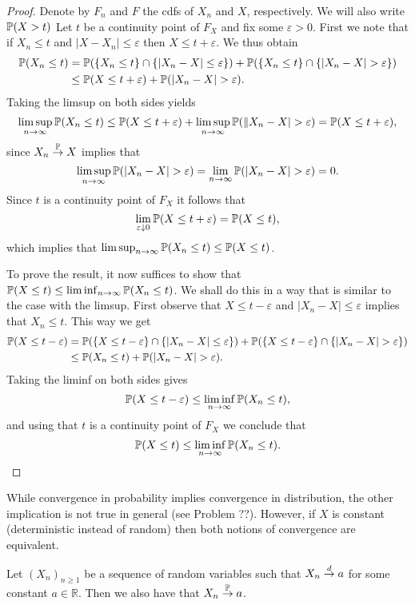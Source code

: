 \begin{proof}
Denote by $F_n$ and $F$ the cdfs of $X_n$ and $X$, respectively. We will also write $\mathbb P(X > t)$ Let $t$ be a continuity point of $F_X$ and fix some $\varepsilon > 0$. First we note that if $X_n \le t$ and $|X-X_n|\le \varepsilon$ then $X \le t + \varepsilon$. We thus obtain
\begin{align*}
	\bbP(X_n \le t)
	&= \bbP(\{X_n \le t\} \cap \{|X_n - X| \le \varepsilon\}) + \bbP(\{X_n \le t\} \cap \{|X_n - X|>\varepsilon\})\\
	&\le \bbP(X \le t + \varepsilon) + \bbP(|X_n - X| > \varepsilon).
\end{align*}
Taking the limsup on both sides yields
\[
	\limsup_{n \to \infty} \mathbb P(X_n \le t)
	\le \mathbb P(X \le t + \varepsilon) + \limsup_{n \to \infty} \mathbb P(\|X_n - X| > \varepsilon)
	= \mathbb P(X \le t + \varepsilon),
\]
since $X_n \stackrel{\mathbb P}{\rightarrow} X$ implies that
\[
	\limsup_{n \to \infty} \mathbb P(|X_n - X| > \varepsilon)
	= \lim_{n \to \infty} \mathbb P(|X_n - X| > \varepsilon) = 0.
\]
Since $t$ is a continuity point of $F_X$ it follows that 
\[
	\lim_{\varepsilon \downarrow 0} \mathbb P(X \le t + \varepsilon) = \mathbb P(X \le t),
\]
which implies that $\limsup_{n \to \infty} \mathbb P(X_n \le t) \le \mathbb P(X \le t)$.

To prove the result, it now suffices to show that $\mathbb P(X \le t) \le \liminf_{n \to \infty} \mathbb P(X_n \le t)$.
We shall do this in a way that is similar to the case with the limsup. First observe that $X \le t - \varepsilon$ and $|X_n - X| \le \varepsilon$ implies that $X_n \le t$. This way we get
\begin{align*}
	\bbP(X \le t - \varepsilon)
	&= \bbP(\{X \le t - \varepsilon\} \cap \{|X_n -X|\le \varepsilon\}) + \bbP(\{X \le t - \varepsilon\} \cap \{|X_n - X|>\varepsilon\})\\
	&\le \bbP(X_n \le t) + \bbP(|X_n - X| > \varepsilon).
\end{align*}
Taking the liminf on both sides gives
\[
	\mathbb P(X \le t - \varepsilon)
	\le \liminf_{n \to \infty} \mathbb P(X_n \le t),
\]
and using that $t$ is a continuity point of $F_X$ we conclude that 
\[
	\mathbb P(X \le t) \le \liminf_{n \to \infty} \mathbb P(X_n \le t).
\]
\end{proof}

While convergence in probability implies convergence in distribution, the other implication is not true in general (see Problem ??). However, if $X$ is constant (deterministic instead of random) then both notions of convergence are equivalent.

\begin{lemma}{}\label{lem:dlim_constant_plim}
Let $(X_n)_{n \ge 1}$ be a sequence of random variables such that $X_n \stackrel{d}{\rightarrow} a$ for some constant $a \in \mathbb{R}$. Then we also have that $X_n \stackrel{\mathbb P}{\rightarrow} a$.
\end{lemma}

